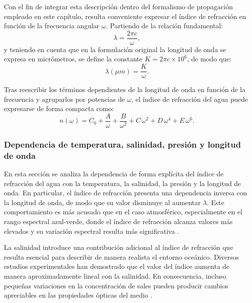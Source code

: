 Con el fin de integrar esta descripción dentro del formalismo de propagación empleado en este capítulo, resulta conveniente expresar el índice de refracción en función de la frecuencia angular $\omega$. Partiendo de la relación fundamental: \begin{equation}
\lambda = \frac{2\pi c}{\omega},
\end{equation}
y teniendo en cuenta que en la formulación original la longitud de onda se expresa en micrómetros, se define la constante $K = 2\pi c \times 10^{6}$, de modo que:
\begin{equation}
\lambda(\mu m) = \frac{K}{\omega}.
\end{equation}

Tras reescribir los términos dependientes de la longitud de onda en función de la frecuencia y agruparlos por potencias de $\omega$, el índice de refracción del agua puede expresarse de forma compacta como:
\begin{equation}
n(\omega) = C_0 + \frac{A}{\omega} + \frac{B}{\omega^2} + C\,\omega^2 + D\,\omega^4 + E\,\omega^6.
\label{eq:n_agua_compacto}
\end{equation}



\subsubsection{Dependencia de temperatura, salinidad, presión y longitud de onda}

En esta sección se analiza la dependencia de forma explícita del índice de refracción del agua con la temperatura, la salinidad, la presión y la longitud de onda. En particular, el índice de refracción presenta una dependencia inversa con la longitud de onda, de modo que su valor disminuye al aumentar $\lambda$. Este comportamiento es más acusado que en el caso atmosférico, especialmente en el rango espectral azul-verde, donde el índice de refracción alcanza valores más elevados y su variación espectral resulta más significativa \cite{Quan}.

La salinidad introduce una contribución adicional al índice de refracción que resulta esencial para describir de manera realista el entorno oceánico. Diversos estudios experimentales han demostrado que el valor del índice aumenta de manera aproximadamente lineal con la salinidad. En consecuencia, incluso pequeñas variaciones en la concentración de sales pueden producir cambios apreciables en las propiedades ópticas del medio \cite{Millard, Quan}.

